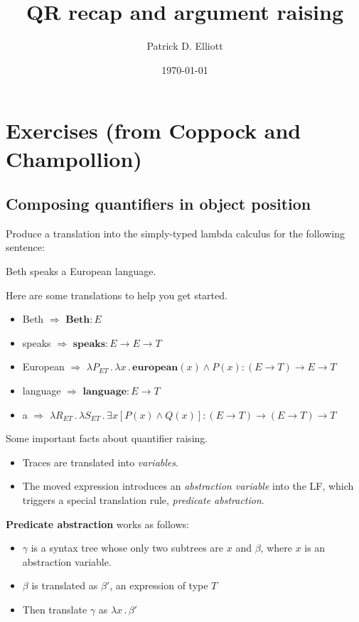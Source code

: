 \documentclass[letterpaper,parskip=half]{scrartcl}
\author{Patrick D. Elliott}
\date{\today}
\title{QR recap and argument raising}
\begin{document}
\maketitle
\tableofcontents


\section{Exercises (from Coppock and Champollion)}
\label{sec:org4601281}

\subsection{Composing quantifiers in object position}
\label{sec:org1745c6e}

Produce a translation into the simply-typed lambda calculus for the following sentence:

\begin{exe}
\ex Beth speaks a European language.
\label{orga7cf4ec}
\end{exe}

Here are some translations to help you get started.  

\begin{itemize}
\item Beth \(\Rightarrow\) \(\mathbf{Beth} : E\)
\item speaks \(\Rightarrow\) \(\mathbf{speaks} : E \to E \to T\)
\item European \(\Rightarrow\) \(\lambda P_{ET }\,.\,\lambda x\,.\,\mathbf{european}(x) \wedge P(x) : (E \to T) \to E \to T\)
\item language \(\Rightarrow\) \(\mathbf{language} :E \to T\)
\item a \(\Rightarrow\) \(\lambda R_{ET}\,.\,\lambda S_{ET}\,.\,\exists x[P(x) \wedge Q(x)] : (E \to T) \to (E \to T) \to T\)
\end{itemize}

Some important facts about quantifier raising.
\begin{itemize}
\item Traces are translated into \emph{variables}.
\item The moved expression introduces an \emph{abstraction variable} into the LF, which triggers a special translation rule, \emph{predicate abstraction}.
\end{itemize}

\textbf{Predicate abstraction} works as follows:

\begin{itemize}
\item \(\gamma\) is a syntax tree whose only two subtrees are \(x\) and \(\beta\), where \(x\) is an abstraction variable.
\item \(\beta\) is translated as \(\beta'\), an expression of type \(T\)
\item Then translate \(\gamma\) as \(\lambda x\,.\,\beta'\)
\end{itemize}
\end{document}

